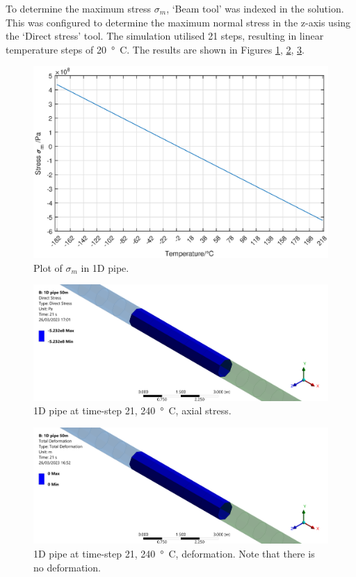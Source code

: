 To determine the maximum stress $\sigma_m$, `Beam tool' was indexed in the solution. This was configured to determine the maximum normal stress in the z-axis using the `Direct stress' tool. The simulation utilised 21 steps, resulting in linear temperature steps of \SI{20}{\degree C}. The results are shown in Figures \ref{part1dSimResults}, \ref{part1d2}, \ref{part1d3}.
\begin{figure}[H]
    \centering
    \includegraphics[width = \textwidth]{img/part1di.eps}
    \caption{Plot of $\sigma_m$ in 1D pipe.}
    \label{part1dSimResults}
\end{figure}
\begin{figure}[H]
    \centering
    \includegraphics[width=\textwidth]{img/part1d-4.png}
    \caption{1D pipe at time-step 21, \SI{240}{\degree C}, axial stress.}
    \label{part1d2}
\end{figure}%
\begin{figure}[H]
    \centering
    \includegraphics[width=\textwidth]{img/part1d-3.png}
    \caption{1D pipe at time-step 21, \SI{240}{\degree C}, deformation. Note that there is no deformation.}
    \label{part1d3}
\end{figure}%

